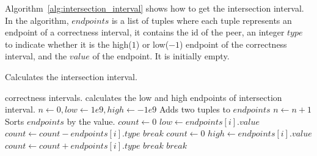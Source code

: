 Algorithm~\ref{alg:intersection_interval} shows how to get the intersection interval.
In the algorithm,
$endpoints$ is a list of tuples where each tuple represents an endpoint of a
correctness interval, it contains the id of the peer, an integer $type$ to
indicate whether it is the high($1$) or low($-1$) endpoint of the correctness
interval, and the $value$ of the endpoint. It is initially empty.

\begin{algorithm}[ht]
    \centering
    \small
    \caption{Calculates the intersection interval.}
    \begin{algorithmic}[1]
        \REQUIRE
            correctness intervals.
        \ENSURE
            calculates the low and high endpoints of intersection interval.
        \STATE
        \STATE
            $n \leftarrow 0, low \leftarrow 1e9, high \leftarrow -1e9$
            \STATE
            Adds two tuples to $endpoints$
            \STATE
            $n \leftarrow n + 1$
        \ENDFOR
        \STATE
            Sorts $endpoints$ by the value.
        \STATE
        \STATE
            \STATE
            \STATE
            $count \leftarrow 0$
                \STATE
                $low \leftarrow endpoints[i].value$
                \STATE
                $count \leftarrow count - endpoints[i].type$
                \STATE
                    $break$
                \ENDIF
            \ENDFOR
            \STATE
            \STATE
            \STATE
            $count \leftarrow 0$
                \STATE
                $high \leftarrow endpoints[i].value$
                \STATE
                $count \leftarrow count + endpoints[i].type$
                    \STATE
                    $break$
                \ENDIF
            \ENDFOR
            \STATE
            \STATE
                \STATE
                $break$
            \ENDIF
        \ENDFOR
    \end{algorithmic}
\label{alg:intersection_interval}
\end{algorithm}

